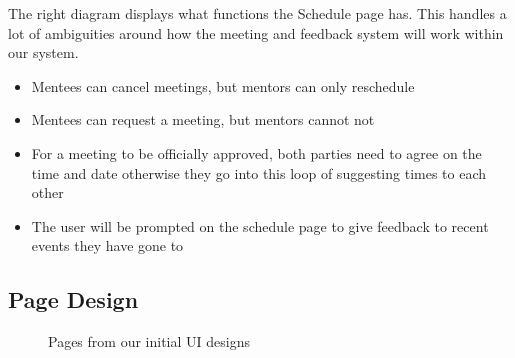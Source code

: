 \documentclass[10pt]{article}
\begin{document}
The right diagram displays what functions the Schedule page has. This handles a
lot of ambiguities around how the meeting and feedback system will work within
our system.
\begin{itemize}[leftmargin=1.2cm,noitemsep,align=left]
    \item Mentees can cancel meetings, but mentors can only reschedule
    \item Mentees can request a meeting, but mentors cannot not
    \item For a meeting to be officially approved, both parties need to agree on the time and date otherwise they go into this loop of suggesting times to each other
    \item The user will be prompted on the schedule page to give feedback to recent events they have gone to
\end{itemize}



\subsection{Page Design}
\begin{figure}[H]
    \centering
    \qquad
    \caption{Pages from our initial UI designs}
    \label{fig:ui_designs}
\end{figure}
\end{document}
